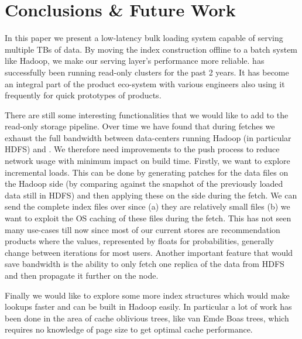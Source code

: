 \section{Conclusions \& Future Work}
\label{sec:conclusion}

In this paper we present a low-latency bulk loading system capable of serving multiple TBs of data. By moving the index construction offline to a batch system like Hadoop, we make our serving layer's performance more reliable. \linkedin{} has successfully been running read-only \projectname{} clusters for the past 2 years. It has become an integral part of the product eco-system with various engineers also using it frequently for quick prototypes of products. 

There are still some interesting functionalities that we would like to add to the read-only storage pipeline. Over time we have found that during fetches we exhaust the full bandwidth between data-centers running Hadoop (in particular HDFS) and \projectname{}. We therefore need improvements to the push process to reduce network usage with minimum impact on build time. Firstly, we want to explore incremental loads. This can be done by generating patches for the data files on the Hadoop side (by comparing against the snapshot of the previously loaded data still in HDFS) and then applying these on the \projectname{} side during the fetch. We can send the complete index files over since (a) they are relatively small files (b) we want to exploit the OS caching of these files during the fetch. This has not seen many use-cases till now since most of our current stores are recommendation products where the values, represented by floats for probabilities, generally change between iterations for most users. Another important feature that would save bandwidth is the ability to only fetch one replica of the data from HDFS and then propagate it further on the \projectname{} node. 

Finally we would like to explore some more index structures which would make lookups faster and can be built in Hadoop easily. In particular a lot of work has been done in the area of cache oblivious trees, like van Emde Boas trees, which requires no knowledge of page size to get optimal cache performance. 
